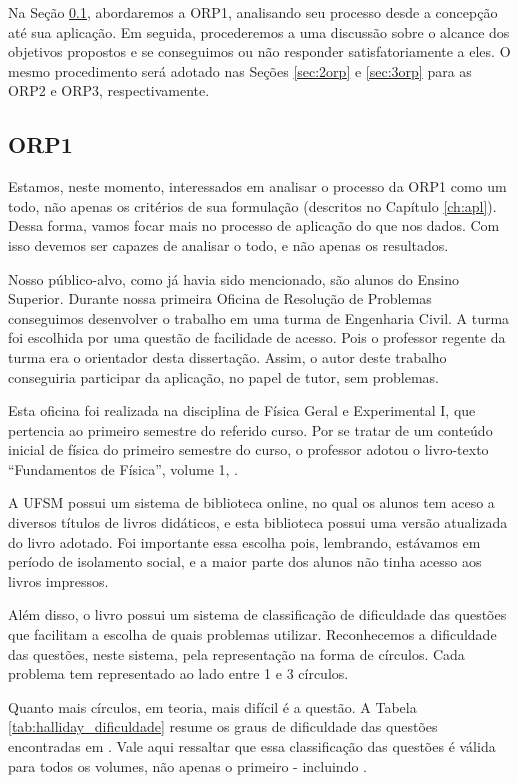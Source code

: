 Na Seção \ref{sec:orp1}, abordaremos a ORP1, analisando seu processo desde a concepção até sua aplicação. Em seguida, procederemos a uma discussão sobre o alcance dos objetivos propostos e se conseguimos ou não responder satisfatoriamente a eles. O mesmo procedimento será adotado nas Seções \ref{sec:2orp} e \ref{sec:3orp} para as ORP2 e ORP3, respectivamente. 

\subsection{ORP1} \label{sec:orp1}

Estamos, neste momento, interessados em analisar o processo da ORP1 como um todo, não apenas os critérios de sua formulação (descritos no Capítulo \ref{ch:apl}). Dessa forma, vamos focar mais no processo de aplicação do que nos dados. Com isso devemos ser capazes de analisar o todo, e não apenas os resultados.

Nosso público-alvo, como já havia sido mencionado, são alunos do Ensino Superior. Durante nossa primeira Oficina de Resolução de Problemas conseguimos desenvolver o trabalho em uma turma de Engenharia Civil. A turma foi escolhida por uma questão de facilidade de acesso. Pois o professor regente da turma era o orientador desta dissertação. Assim, o autor deste trabalho conseguiria participar da aplicação, no papel de tutor, sem problemas.

Esta oficina foi realizada na disciplina de Física Geral e Experimental I, que pertencia ao primeiro semestre do referido curso. Por se tratar de um conteúdo inicial de física do primeiro semestre do curso, o professor adotou o livro-texto “Fundamentos de Física”, volume 1, .

A UFSM possui um sistema de biblioteca online, no qual os alunos tem aceso a diversos títulos de livros didáticos, e esta biblioteca possui uma versão atualizada do livro adotado. Foi importante essa escolha pois, lembrando, estávamos em período de isolamento social, e a maior parte dos alunos não tinha acesso aos livros impressos.

Além disso, o livro possui um sistema de classificação de dificuldade das questões que facilitam a escolha de quais problemas utilizar. Reconhecemos a dificuldade das questões, neste sistema, pela representação na forma de círculos. Cada problema tem representado ao lado entre 1 e 3 círculos. 

Quanto mais círculos, em teoria, mais difícil é a questão. A Tabela \ref{tab:halliday_dificuldade} resume os graus de dificuldade das questões encontradas em . Vale aqui ressaltar que essa classificação das questões é válida para todos os volumes, não apenas o primeiro - incluindo .

